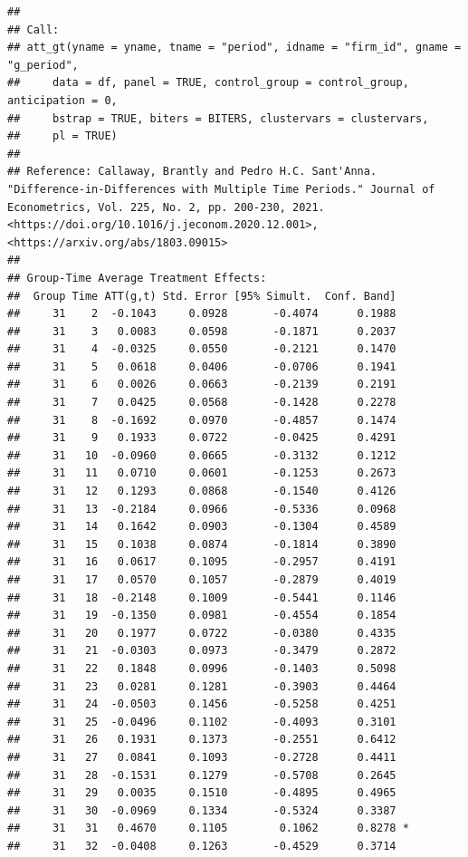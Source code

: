 \documentclass[
]{article}
\begin{document}
\begin{verbatim}
## 
## Call:
## att_gt(yname = yname, tname = "period", idname = "firm_id", gname = "g_period", 
##     data = df, panel = TRUE, control_group = control_group, anticipation = 0, 
##     bstrap = TRUE, biters = BITERS, clustervars = clustervars, 
##     pl = TRUE)
## 
## Reference: Callaway, Brantly and Pedro H.C. Sant'Anna.  "Difference-in-Differences with Multiple Time Periods." Journal of Econometrics, Vol. 225, No. 2, pp. 200-230, 2021. <https://doi.org/10.1016/j.jeconom.2020.12.001>, <https://arxiv.org/abs/1803.09015> 
## 
## Group-Time Average Treatment Effects:
##  Group Time ATT(g,t) Std. Error [95% Simult.  Conf. Band]  
##     31    2  -0.1043     0.0928       -0.4074      0.1988  
##     31    3   0.0083     0.0598       -0.1871      0.2037  
##     31    4  -0.0325     0.0550       -0.2121      0.1470  
##     31    5   0.0618     0.0406       -0.0706      0.1941  
##     31    6   0.0026     0.0663       -0.2139      0.2191  
##     31    7   0.0425     0.0568       -0.1428      0.2278  
##     31    8  -0.1692     0.0970       -0.4857      0.1474  
##     31    9   0.1933     0.0722       -0.0425      0.4291  
##     31   10  -0.0960     0.0665       -0.3132      0.1212  
##     31   11   0.0710     0.0601       -0.1253      0.2673  
##     31   12   0.1293     0.0868       -0.1540      0.4126  
##     31   13  -0.2184     0.0966       -0.5336      0.0968  
##     31   14   0.1642     0.0903       -0.1304      0.4589  
##     31   15   0.1038     0.0874       -0.1814      0.3890  
##     31   16   0.0617     0.1095       -0.2957      0.4191  
##     31   17   0.0570     0.1057       -0.2879      0.4019  
##     31   18  -0.2148     0.1009       -0.5441      0.1146  
##     31   19  -0.1350     0.0981       -0.4554      0.1854  
##     31   20   0.1977     0.0722       -0.0380      0.4335  
##     31   21  -0.0303     0.0973       -0.3479      0.2872  
##     31   22   0.1848     0.0996       -0.1403      0.5098  
##     31   23   0.0281     0.1281       -0.3903      0.4464  
##     31   24  -0.0503     0.1456       -0.5258      0.4251  
##     31   25  -0.0496     0.1102       -0.4093      0.3101  
##     31   26   0.1931     0.1373       -0.2551      0.6412  
##     31   27   0.0841     0.1093       -0.2728      0.4411  
##     31   28  -0.1531     0.1279       -0.5708      0.2645  
##     31   29   0.0035     0.1510       -0.4895      0.4965  
##     31   30  -0.0969     0.1334       -0.5324      0.3387  
##     31   31   0.4670     0.1105        0.1062      0.8278 *
##     31   32  -0.0408     0.1263       -0.4529      0.3714  

\end{verbatim}
\end{document}
